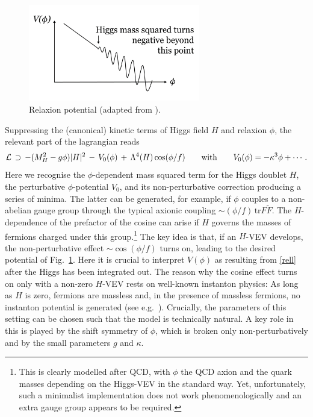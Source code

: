 \documentclass[12pt]{article}
\newcommand{\be}{\begin{equation}}
\newcommand{\ee}{\end{equation}}
\numberwithin{equation}{section}
\begin{document}
\begin{figure}[ht]
\begin{center} 
\includegraphics[width=7.5cm]{rel.png}
\caption{Relaxion potential (adapted from \cite{Graham:2015cka}).}
\label{rel} 
\end{center}
\end{figure}

Suppressing the (canonical) kinetic terms of Higgs field $H$ and relaxion $\phi$, the relevant part of the lagrangian reads
\be
{\cal L}\,\supset\, -(M_H^2-g\phi)|H|^2\,-\,V_0(\phi)\,+\,\Lambda^4(H)\cos(\phi/f)\qquad\mbox{with}\qquad
V_0(\phi)=-\kappa^3\phi+\cdots\,.\label{rell}
\ee
Here we recognise the $\phi$-dependent mass squared term for the Higgs doublet $H$, the perturbative $\phi$-potential $V_0$, and its non-perturbative correction producing a series of minima. The latter can be generated, for example, if $\phi$ couples to a non-abelian gauge group through the typical axionic coupling $\sim(\phi/f)\,\mbox{tr}F\tilde{F}$. The $H$-dependence of the prefactor of the cosine can arise if $H$ governs the masses of fermions charged under this group.\footnote{
This
is clearly modelled after QCD, with $\phi$ the QCD axion and the quark masses depending on the Higgs-VEV in the standard way. Yet, unfortunately, such a minimalist implementation does not work phenomenologically and an extra gauge group appears to be required.
} 
The key idea is that, if an $H$-VEV develops, the non-perturbative effect $\sim\cos(\phi/f)$ turns on, leading to the desired potential of Fig.~\ref{rel}. Here it is crucial to interpret $V(\phi)$ as resulting from \eqref{rell} after the Higgs has been integrated out. The reason why the cosine effect turns on only with a non-zero $H$-VEV rests on well-known instanton physics: As long as $H$ is zero, fermions are massless and, in the presence of massless fermions, no instanton potential is generated (see e.g.~\cite{Coleman:1985rnk, shifman}). Crucially, the parameters of this setting can be chosen such that the model is technically natural. A key role in this is played by the shift symmetry of $\phi$, which is broken only non-perturbatively and by the small parameters $g$ and $\kappa$.
\end{document}

